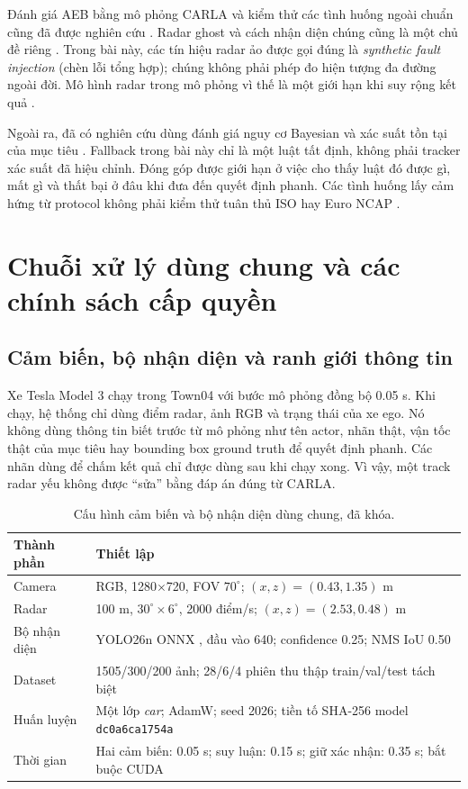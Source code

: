 \documentclass[conference]{IEEEtran}
\begin{document}
Đánh giá AEB bằng mô phỏng CARLA và kiểm thử các tình huống ngoài chuẩn cũng
đã được nghiên cứu \cite{gomez2022carla,feng2025dvs,rao2024corner}. Radar ghost
và cách nhận diện chúng cũng là một chủ đề riêng \cite{kraus2021ghost}. Trong
bài này, các tín hiệu radar ảo được gọi đúng là \emph{synthetic fault injection}
(chèn lỗi tổng hợp); chúng không phải phép đo hiện tượng đa đường ngoài đời.
Mô hình radar trong mô phỏng vì thế là một giới hạn khi suy rộng kết quả
\cite{magosi2022radar}.

Ngoài ra, đã có nghiên cứu dùng đánh giá nguy cơ Bayesian và xác suất tồn tại
của mục tiêu \cite{sandblom2011threat,lindenmaier2022existence}. Fallback trong
bài này chỉ là một luật tất định, không phải tracker xác suất đã hiệu chỉnh.
Đóng góp được giới hạn ở việc cho thấy luật đó được gì, mất gì và thất bại ở
đâu khi đưa đến quyết định phanh. Các tình huống lấy cảm hứng từ protocol không
phải kiểm thử tuân thủ ISO hay Euro NCAP \cite{iso15623,euroncap_aeb}.

\section{Chuỗi xử lý dùng chung và các chính sách cấp quyền}
\subsection{Cảm biến, bộ nhận diện và ranh giới thông tin}
Xe Tesla Model 3 chạy trong Town04 với bước mô phỏng đồng bộ 0.05 s. Khi chạy,
hệ thống chỉ dùng điểm radar, ảnh RGB và trạng thái của xe ego. Nó không dùng
thông tin biết trước từ mô phỏng như tên actor, nhãn thật, vận tốc thật của mục
tiêu hay bounding box ground truth để quyết định phanh. Các nhãn dùng để chấm
kết quả chỉ được dùng sau khi chạy xong. Vì vậy, một track radar yếu không được
``sửa'' bằng đáp án đúng từ CARLA.

\begin{table}[t]
\caption{Cấu hình cảm biến và bộ nhận diện dùng chung, đã khóa.}
\label{tab:setup}
\centering\scriptsize
\setlength{\tabcolsep}{3pt}
\begin{tabular}{p{}p{}}
\toprule Thành phần & Thiết lập\\ \midrule
Camera & RGB, 1280$\times$720, FOV $70^\circ$; $(x,z)=(0.43,1.35)$ m\\
Radar & 100 m, $30^\circ\!\times6^\circ$, 2000 điểm/s; $(x,z)=(2.53,0.48)$ m\\
Bộ nhận diện & YOLO26n ONNX \cite{ultralytics_yolo}, đầu vào 640; confidence 0.25; NMS IoU 0.50\\
Dataset & 1505/300/200 ảnh; 28/6/4 phiên thu thập train/val/test tách biệt\\
Huấn luyện & Một lớp \emph{car}; AdamW; seed 2026; tiền tố SHA-256 model \texttt{dc0a6ca1754a}\\
Thời gian & Hai cảm biến: 0.05 s; suy luận: 0.15 s; giữ xác nhận: 0.35 s; bắt buộc CUDA\\
\bottomrule
\end{tabular}
\end{table}
\end{document}
